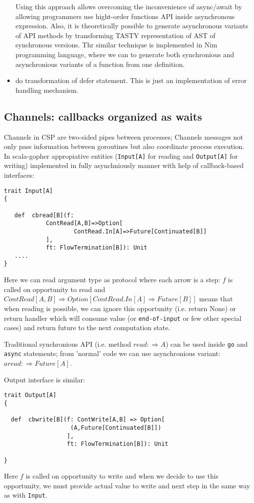 \documentclass[12pt]{article}
\newcommand{\To}{\Rightarrow}
\begin{document}
\begin{itemize}
 Using this approach allows overcoming the inconvenience of async/await by allowing programmers use hight-order functions API inside asynchronous expression. Also, it is theoretically possible to generate asynchronous variants of API methods by transforming TASTY\cite{TASTY} representation of AST of synchronous versions. Thr similar technique is implemented in Nim \cite{Nim} programming language, where we can to generate both synchronious and asynchronious variants of a function from one definition.
  
 \item do transformation of defer statement. This is just an implementation of error handling mechanism.

\end{itemize}

\subsection{Channels: callbacks organized as waits}

  Channels in CSP are two-sided pipes between processes; Channels messages not only pass information between goroutines but also coordinate process execution.
  In scala-gopher appropiative entities (\verb|Input[A]| for reading and \verb|Output[A]| for writing) implemented in fully asynchniously manner with help of callback-based interfaces:

\begin{Verbatim}[fontsize=\small]
trait Input[A]
{

   def  cbread[B](f:
            ContRead[A,B]=>Option[
                    ContRead.In[A]=>Future[Continuated[B]]
            ],
            ft: FlowTermination[B]): Unit
   ....
}
\end{Verbatim}

  Here we can read argument type as protocol where each arrow is a step: 
    $f$ is called on opportunity to read and
      $ContRead[A,B] \To Option[ContRead.In[A] \To Future[B]]$ means that when reading is 
   possible, we can ignore this opportunity (i.e. return None) or return handler which will
   consume value (or \verb|end-of-input| or few other special cases) and return future to the next 
   computation state.

  Traditional synchronious API  (i.e. method $read:\To A$) can be used inside \verb|go| and \verb|async| statements; from 'normal' code we can use asynchronious variant: $aread: \To Future[A]$.

  Output interface is similar:
\begin{Verbatim}[fontsize=\small]
trait Output[A] 
{

  def  cbwrite[B](f: ContWrite[A,B] => Option[
                   (A,Future[Continuated[B]])
                  ],
                  ft: FlowTermination[B]): Unit
  
}
\end{Verbatim}
  Here $f$ is called on opportunity to write and when we decide to use this opportunity, we
 must provide actual value to write and next step in the same way as with \verb|Input|.
\end{document}

